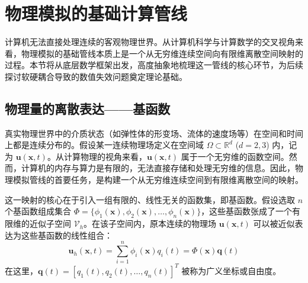 \section{物理模拟的基础计算管线}

计算机无法直接处理连续的客观物理世界。从计算机科学与计算数学的交叉视角来看，物理模拟的基础管线本质上是一个从无穷维连续空间向有限维离散空间映射的过程。本节将从底层数学框架出发，高度抽象地梳理这一管线的核心环节，为后续探讨软硬耦合导致的数值失效问题奠定理论基础。

\subsection{物理量的离散表达——基函数}

真实物理世界中的介质状态（如弹性体的形变场、流体的速度场等）在空间和时间上都是连续分布的。假设某一连续物理场定义在空间域 $\Omega \subset \mathbb{R}^d$ ($d=2,3$) 内，记为 $\mathbf{u}(\mathbf{x}, t)$。从计算物理的视角来看，$\mathbf{u}(\mathbf{x}, t)$ 属于一个无穷维的函数空间。然而，计算机的内存与算力是有限的，无法直接存储和处理无穷维的信息。因此，物理模拟管线的首要任务，是构建一个从无穷维连续空间到有限维离散空间的映射。

这一映射的核心在于引入一组有限的、线性无关的函数集，即基函数。假设选取 $n$ 个基函数组成集合 $\Phi = \{\phi_1(\mathbf{x}), \phi_2(\mathbf{x}), \dots, \phi_n(\mathbf{x})\}$，这些基函数张成了一个有限维的近似子空间 $\mathcal{V}_h$。在该子空间内，原本连续的物理场 $\mathbf{u}(\mathbf{x}, t)$ 可以被近似表达为这些基函数的线性组合：
\begin{equation}
    \mathbf{u}_h(\mathbf{x}, t) = \sum_{i=1}^{n} \phi_i(\mathbf{x}) q_i(t) = \Phi(\mathbf{x}) \mathbf{q}(t)
\end{equation}
在这里，$\mathbf{q}(t) = [q_1(t), q_2(t), \dots, q_n(t)]^T$ 被称为广义坐标或自由度。



